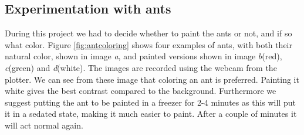 
\subsection{Experimentation with ants}
\label{ants}

During this project we had to decide whether to paint the ants or not, and if so what color. Figure \ref{fig:antcoloring} shows four examples of ants, with both their natural color, shown in image \emph{a}, and painted versions shown in image \emph{b}(red), \emph{c}(green) and \emph{d}(white). The images are recorded using the webcam from the plotter. We can see from these image that coloring an ant is preferred. Painting it white gives the best contrast compared to the background. Furthermore we suggest putting the ant to be painted in a freezer for 2-4 minutes as this will put it in a sedated state, making it much easier to paint. After a couple of minutes it will act normal again.\\

